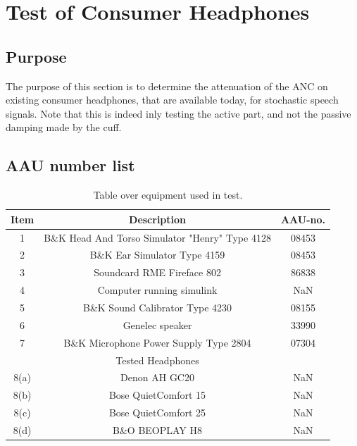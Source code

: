 
\section{Test of Consumer Headphones}
\subsection{Purpose}
The purpose of this section is to determine the attenuation of the ANC on existing consumer headphones, that are available today, for stochastic speech signals.
Note that this is indeed inly testing the active part, and not the passive damping made by the cuff.


\subsection{AAU number list}
\begin{table}[H]
	\centering
	\begin{tabular}{ c c c } \toprule
	{Item}	&	{Description} 								& {AAU-no}. \\ 
								\bottomrule 
		1	&	B\&K Head And Torso Simulator "Henry" Type 4128	& 08453	\\
		2	&	B\&K Ear Simulator Type 4159				& 08453		\\
		3	&	Soundcard RME Fireface 802					& 86838		\\
		4	&	Computer running simulink					& NaN		\\
		5	&	B\&K Sound Calibrator Type 4230				& 08155		\\ 
		6	&	Genelec speaker								& 33990		\\ 
		7	& 	B\&K Microphone Power Supply Type 2804		& 07304		\\
								\bottomrule
							& Tested Headphones 			& 			\\
								\bottomrule
		8(a)	& Denon AH GC20 								& NaN 		\\
		8(b)	& Bose QuietComfort 15 							& NaN 		\\
		8(c)	& Bose QuietComfort 25						 	& NaN		\\
		8(d)	& B\&O BEOPLAY H8 								& NaN		\\
								\bottomrule
	\end{tabular}
	\caption{Table over equipment used in test.}
	\label{tab:UsedEquipmentListConsumerHP}
\end{table}

